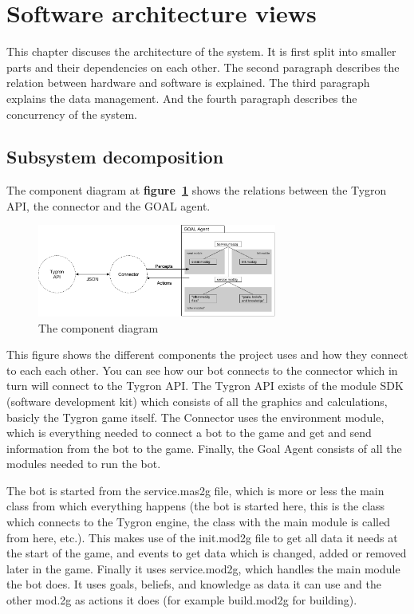 \label{Software architecture views}
\section{Software architecture views}
This chapter discuses the architecture of the system. It is first split into smaller parts and their dependencies on each other. The second paragraph describes the relation between hardware and software is explained. The third paragraph explains the data management. And the fourth paragraph describes the concurrency of the system.

\subsection{Subsystem decomposition}

The component diagram at \textbf{figure~\ref{fig:comp_diag}} shows the relations between the Tygron API, the connector and the GOAL agent. 

\begin{figure}[h]
	  \centering
	  \includegraphics[width=0.7\textwidth]{system_decomposition}
	  \caption{The component diagram}
	  \label{fig:comp_diag}
\end{figure}
This figure shows the different components the project uses and how they connect to each each other. You can see how our bot connects to the connector which in turn will connect to the Tygron API. The Tygron API exists of the module SDK (software development kit) which consists of all the graphics and calculations, basicly the Tygron game itself. The Connector uses the environment module, which is everything needed to connect a bot to the game and get and send information from the bot to the game. Finally, the Goal Agent consists of all the modules needed to run the bot.

The bot is started from the service.mas2g file, which is more or less the main class from which everything happens (the bot is started here, this is the class which connects to the Tygron engine, the class with the main module is called from here, etc.). This makes use of the init.mod2g file to get all data it needs at the start of the game, and events to get data which is changed, added or removed later in the game. Finally it uses service.mod2g, which handles the main module the bot does. It uses goals, beliefs, and knowledge as data it can use and the other mod.2g as actions it does (for example build.mod2g for building).

